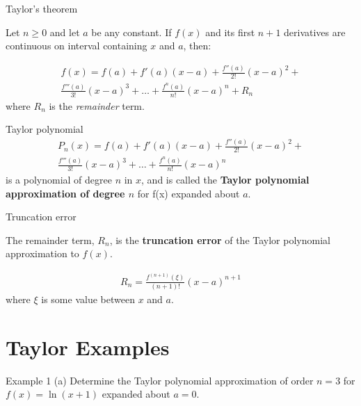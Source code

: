 \documentclass[12pt]{beamer}
\begin{document}
\begin{frame}{Taylor's theorem}

\begin{theorem}
Let $n \geq 0$ and let $a$ be any constant. If $f(x)$ and its first $n+1$ derivatives are continuous on interval containing $x$ and $a$, then: 

\begin{eqnarray*}
 f(x) = f(a) + f'(a)(x-a) + \frac{f''(a)}{2!}(x-a)^2 + \\ \frac{f'''(a)}{3!}(x-a)^3 + \dots + \frac{f^{n}(a)}{n!}(x-a)^{n} + R_n
\end{eqnarray*}
\noindent 
where $R_n$ is the {\it remainder} term.

\end{theorem}



\end{frame} 

\begin{frame}{Taylor polynomial} 
\begin{eqnarray*}
P_n(x) = f(a) + f'(a)(x-a) + \frac{f''(a)}{2!}(x-a)^2 + \\ \frac{f'''(a)}{3!}(x-a)^3 + \dots + \frac{f^{n}(a)}{n!}(x-a)^{n} 
\end{eqnarray*}
\noindent 
is a polynomial of degree $n$ in $x$, and is called the {\bf Taylor polynomial approximation of degree $n$} for f(x) expanded about $a$.  
\end{frame}

\begin{frame}{Truncation error}

 The remainder term, $R_{n}$, is the {\bf truncation error} of the Taylor polynomial approximation to $f(x)$.

\begin{eqnarray*}
R_{n} = \frac{f^{(n+1)}(\xi)}{(n+1)!} (x-a)^{n+1} 
\end{eqnarray*}
\noindent 
where $\xi$ is some value between $x$ and $a$. 


\end{frame} 

\section{Taylor Examples} 

\begin{frame}{Example 1}
(a) Determine the Taylor polynomial approximation of order $n=3$ for 
$f(x) = \ln(x+1)$ expanded about $a=0$.
\vspace{3 in}
\end{frame}
\end{document}
